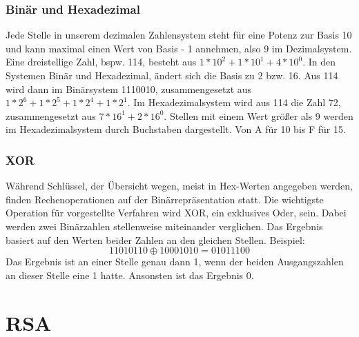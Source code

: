 \documentclass[conference,10pt,a4paper,twocolumn]{IEEEtran}
\begin{document}
\bigskip
\subsubsection{Binär und Hexadezimal}
Jede Stelle in unserem dezimalen Zahlensystem steht für eine Potenz zur Basis 10 und kann maximal einen Wert von Basis - 1 annehmen, also 9 im Dezimalsystem. Eine dreistellige Zahl, bspw. 114, besteht aus \begin{math}1 * 10^2 + 1 * 10^1 + 4 * 10^0\end{math}. In den Systemen Binär und Hexadezimal, ändert sich die Basis zu 2 bzw. 16. Aus 114 wird dann im Binärsystem 1110010, zusammengesetzt aus \begin{math}1 * 2^6 + 1 * 2^5 + 1 * 2^4 + 1 * 2^1\end{math}.
Im Hexadezimalsystem wird aus 114 die Zahl 72, zusammengesetzt aus \begin{math}7 * 16^1 + 2 * 16^0\end{math}. Stellen mit einem Wert größer als 9 werden im Hexadezimalsystem durch Buchstaben dargestellt. Von A für 10 bis F für 15.

\bigskip
\subsubsection{XOR}
Während Schlüssel, der Übersicht wegen, meist in Hex-Werten angegeben werden, finden Rechenoperationen auf der Binärrepräsentation statt. Die wichtigste Operation für vorgestellte Verfahren wird XOR, ein exklusives Oder, sein. Dabei werden zwei Binärzahlen stellenweise miteinander verglichen. Das Ergebnis basiert auf den Werten beider Zahlen an den gleichen Stellen. \linebreak Beispiel: \linebreak
\begin{equation}
11010110 \oplus 10001010 = 01011100
\end{equation}
Das Ergebnis ist an einer Stelle genau dann 1, wenn \underline{} der beiden Ausgangszahlen an dieser Stelle eine 1 hatte. Ansonsten ist das Ergebnis 0.


\section{RSA}
\end{document}
